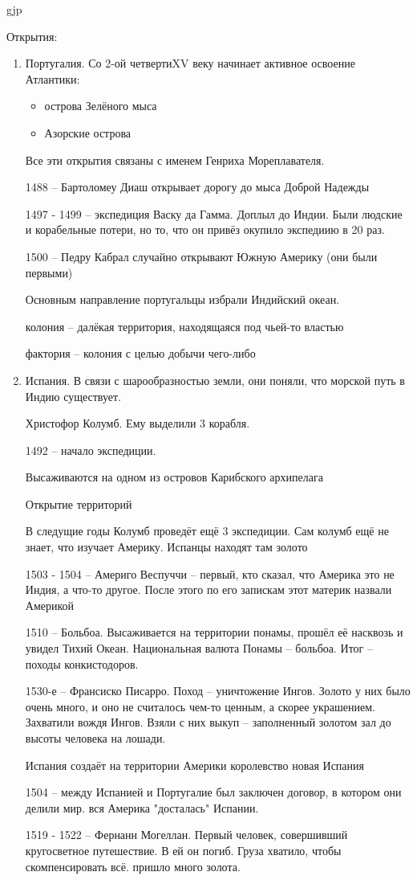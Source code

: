 gjp	 \documentclass[12pt,a4paper]{article}
\begin{document}
Открытия:
\begin{enumerate}
	\item Португалия. Со 2-ой четвертиXV веку начинает активное освоение Атлантики:
	\begin{itemize}
		\item острова Зелёного мыса
		\item Азорские острова
	\end{itemize}
	Все эти открытия связаны с именем Генриха Мореплавателя. 
	
	1488 -- Бартоломеу Диаш открывает дорогу до мыса Доброй Надежды
	
	1497 - 1499 -- экспедиция Васку да Гамма. Доплыл до Индии. Были людские и корабельные потери, но то, что он привёз окупило экспедиию в 20 раз.
	
	1500 -- Педру Кабрал случайно открывают Южную Америку (они были первыми)
	
	Основным направление португальцы избрали Индийский океан.
	
	колония -- далёкая территория, находящаяся под чьей-то властью
	
	фактория -- колония с целью добычи чего-либо
	\item Испания. В связи с шарообразностью земли, они поняли, что морской путь в Индию существует. 
	
	Христофор Колумб. Ему выделили 3 корабля.
	
	1492 -- начало экспедиции.
	
	Высаживаются на одном из островов Карибского архипелага
	
	Открытие территорий
	
	В следущие годы Колумб проведёт ещё 3 экспедиции. Сам колумб ещё не знает, что изучает Америку. Испанцы находят там золото
	
	1503 - 1504 -- Америго Веспуччи -- первый, кто сказал, что Америка это не Индия, а что-то другое. После этого по его запискам этот материк назвали Америкой

	1510 -- Больбоа. Высаживается на территории понамы, прошёл её насквозь и увидел Тихий Океан. Национальная валюта Понамы -- больбоа. Итог -- походы конкистодоров.
	
	1530-е -- Франсиско Писарро. Поход -- уничтожение Ингов. Золото у них было очень много, и оно не считалось чем-то ценным, а скорее украшением. Захватили вождя Ингов. Взяли с них выкуп -- заполненный золотом зал до высоты человека на лошади.
	
	Испания создаёт на территории Америки королевство новая Испания
	
	1504 -- между Испанией и Португалие был заключен договор, в котором они делили мир. вся Америка "досталась" Испании.
	
	1519 - 1522 -- Фернанн Могеллан. Первый человек, совершивший кругосветное путешествие. В ей он  погиб. Груза хватило, чтобы скомпенсировать всё.
пришло много золота.
\end{enumerate}
\end{document}

